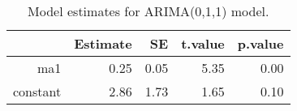 \begin{table}[ht]
\centering
\begin{tabular}{rrrrr}
  \hline
 & Estimate & SE & t.value & p.value \\ 
  \hline
ma1 & 0.25 & 0.05 & 5.35 & 0.00 \\ 
  constant & 2.86 & 1.73 & 1.65 & 0.10 \\ 
   \hline
\end{tabular}
\caption{Model estimates for ARIMA(0,1,1) model.}
\end{table}